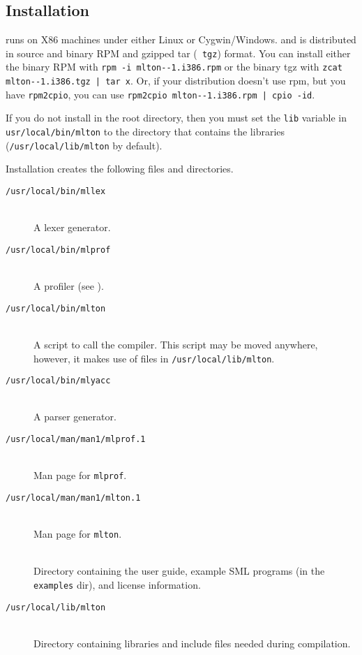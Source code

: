 
\subsection{Installation}

{\mlton} runs on X86 machines under either Linux or Cygwin/Windows.
and is distributed in source and binary RPM and gzipped tar ({\tt
tgz}) format.  You can install either the binary RPM with {\tt rpm -i
mlton-\version-1.i386.rpm} or the binary tgz with {\tt zcat
mlton-\version-1.i386.tgz | tar x}.  Or, if your distribution doesn't
use rpm, but you have {\tt rpm2cpio}, you can use {\tt rpm2cpio
mlton-\version-1.i386.rpm | cpio -id}.

If you do not install {\mlton} in the root directory, then you must
set the {\tt lib} variable in {\tt usr/local/bin/mlton} to the
directory that contains the libraries ({\tt /usr/local/lib/mlton} by
default).

Installation creates the following files and directories.

\newcommand{\place}[1]{\item[\tt #1]\hspace{1in}\\}

\begin{description}

\place{/usr/local/bin/mllex}
A lexer generator.

\place{/usr/local/bin/mlprof}
A profiler (see ).

\place{/usr/local/bin/mlton}
A script to call the compiler.
This script may be moved anywhere, however,
it makes use of files in {\tt /usr/local/lib/mlton}.

\place{/usr/local/bin/mlyacc}
A parser generator.

\place{/usr/local/man/man1/mlprof.1}
Man page for {\tt mlprof}.

\place{/usr/local/man/man1/mlton.1}
Man page for {\tt mlton}.

\place{\doc}
Directory containing the user guide, example SML programs (in the {\tt examples}
dir), and license information.

\place{/usr/local/lib/mlton}
Directory containing libraries and include files needed during
compilation.

\end{description}

